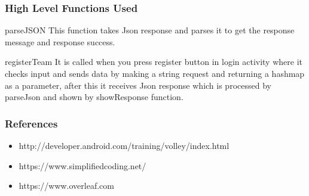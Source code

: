 \documentclass{beamer}
\begin{document}
\begin{frame}
\frametitle{\hspace{3.5cm}High Level Functions Used}
\begin{block}{parseJSON}
This function takes Json response and parses it to get the response message and response success.
\end{block}

\begin{block}{registerTeam}
It is called when you press register button in login activity where it checks input and sends data by making a string request and returning a hashmap as a parameter, after this it receives Json response which is processed by parseJson and shown by  showResponse function.
\end{block}
\end{frame}


\begin{frame}
\frametitle{\hspace{4.5cm}References}
\begin{itemize}
\item http://developer.android.com/training/volley/index.html
\item https://www.simplifiedcoding.net/
\item https://www.overleaf.com
\end{itemize}
\end{frame}

\end{document}
